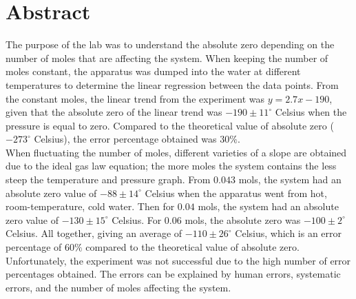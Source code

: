 \documentclass[11pt]{article}
\begin{document}
\section*{Abstract}
The purpose of the lab was to understand the absolute zero depending on the number of moles that are affecting the system. When keeping the number of moles constant, the apparatus was dumped into the water at different temperatures to determine the linear regression between the data points. From the constant moles, the linear trend from the experiment was $y=2.7x-190$, given that the absolute zero of the linear trend was $-190\pm 11^\circ$ Celsius when the pressure is equal to zero. Compared to the theoretical value of absolute zero ($-273^\circ$ Celsius), the error percentage obtained was $30\%$. \\
When fluctuating the number of moles, different varieties of a slope are obtained due to the ideal gas law equation; the more moles the system contains the less steep the temperature and pressure graph. From $0.043$ mols, the system had an absolute zero value of $-88\pm14^\circ$ Celsius when the apparatus went from hot, room-temperature, cold water. Then for $0.04$ mols, the system had an absolute zero value of $-130\pm15^\circ$ Celsius. For 0.06 mols, the absolute zero was $-100\pm2^\circ$ Celsius. All together, giving an average of $-110\pm26^\circ$ Celsius, which is an error percentage of $60\%$ compared to the theoretical value of absolute zero. Unfortunately, the experiment was not successful due to the high number of error percentages obtained. The errors can be explained by human errors, systematic errors, and the number of moles affecting the system. 
\end{document}
